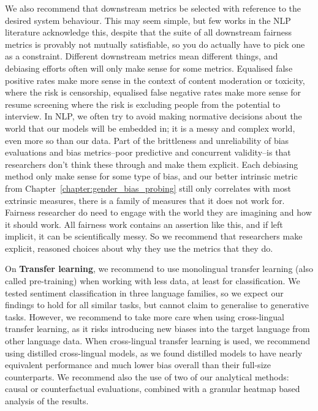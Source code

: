 We also recommend that downstream metrics be selected with reference to the desired system behaviour. This may seem simple, but few works in the NLP literature acknowledge this, despite that the suite of all downstream fairness metrics is provably not mutually satisfiable, so you do actually have to pick one as a constraint. Different downstream metrics mean different things, and debiasing efforts often will only make sense for some metrics. Equalised false positive rates make more sense in the context of content moderation or toxicity, where the risk is censorship, equalised false negative rates make more sense for resume screening where the risk is excluding people from the potential to interview. In NLP, we often try to avoid making normative decisions about the world that our models will be embedded in; it is a messy and complex world, even more so than our data. Part of the brittleness and unreliability of bias evaluations and bias metrics--poor predictive and concurrent validity--is that researchers don't think these through and make them explicit. Each debiasing method only make sense for some type of bias, and our better intrinsic metric from Chapter~\ref{chapter:gender_bias_probing} still only correlates with most extrinsic measures, there is a family of measures that it does not work for. Fairness researcher do need to engage with the world they are imagining and how it should work. All fairness work contains an assertion like this, and if left implicit, it can be scientifically messy. So we recommend that researchers make explicit, reasoned choices about why they use the metrics that they do. 

On \textbf{Transfer learning}, we recommend to use monolingual transfer learning (also called pre-training) when working with less data, at least for classification. We tested sentiment classification in three language families, so we expect our findings to hold for all similar tasks, but cannot claim to generalise to generative tasks.
However, we recommend to take more care when using cross-lingual transfer learning, as it risks introducing new biases into the target language from other language data. When cross-lingual transfer learning is used, we recommend using distilled cross-lingual models, as we found distilled models to have nearly equivalent performance and much lower bias overall than their full-size counterparts. We recommend also the use of two of our analytical methods: causal or counterfactual evaluations, combined with a granular heatmap based analysis of the results.

